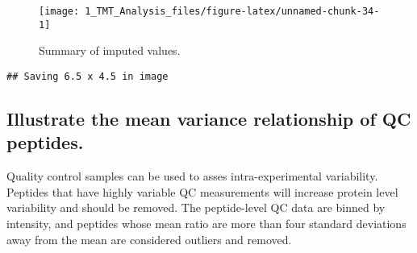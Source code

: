 \documentclass[]{article}
\newenvironment{Shaded}{\begin{snugshade}}{\end{snugshade}}
\newcommand{\KeywordTok}[1]{\textcolor[rgb]{0.13,0.29,0.53}{\textbf{#1}}}
\newcommand{\DataTypeTok}[1]{\textcolor[rgb]{0.13,0.29,0.53}{#1}}
\newcommand{\DecValTok}[1]{\textcolor[rgb]{0.00,0.00,0.81}{#1}}
\newcommand{\StringTok}[1]{\textcolor[rgb]{0.31,0.60,0.02}{#1}}
\newcommand{\CommentTok}[1]{\textcolor[rgb]{0.56,0.35,0.01}{\textit{#1}}}
\newcommand{\OtherTok}[1]{\textcolor[rgb]{0.56,0.35,0.01}{#1}}
\newcommand{\OperatorTok}[1]{\textcolor[rgb]{0.81,0.36,0.00}{\textbf{#1}}}
\newcommand{\NormalTok}[1]{#1}
\begin{document}
\begin{Shaded}
\end{Shaded}

\begin{figure}

{\centering \texttt{[image: 1\_TMT\_Analysis\_files/figure-latex/unnamed-chunk-34-1]} 

}

\caption{Summary of imputed values.}\label{fig:unnamed-chunk-34}
\end{figure}

\begin{verbatim}
## Saving 6.5 x 4.5 in image
\end{verbatim}

\subsection{Illustrate the mean variance relationship of QC
peptides.}\label{illustrate-the-mean-variance-relationship-of-qc-peptides.}

Quality control samples can be used to asses intra-experimental
variability. Peptides that have highly variable QC measurements will
increase protein level variability and should be removed. The
peptide-level QC data are binned by intensity, and peptides whose mean
ratio are more than four standard deviations away from the mean are
considered outliers and removed.
\end{document}
